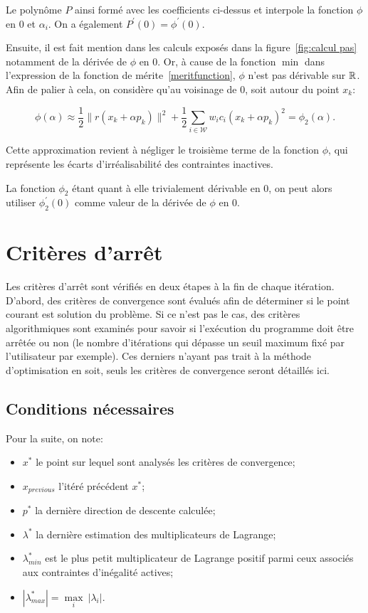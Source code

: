 Le polynôme $P$ ainsi formé avec les coefficients ci-dessus et interpole la fonction $\phi$ en $0$ et $\alpha_i$. On a également $P^\prime(0)=\phi^\prime(0)$.


Ensuite, il est fait mention dans les calculs exposés dans la figure~\ref{fig:calcul pas} notamment de la dérivée de $\phi$ en 0. Or, à cause de la fonction $\min$ dans
l'expression de la fonction de mérite~\eqref{meritfunction}, $\phi$ n'est pas dérivable sur $\mathbb{R}$. Afin de palier à cela, on considère qu'au voisinage de $0$,
soit autour du point $x_k$:

\[\phi(\alpha) \approx \dfrac{1}{2}\|r(x_k+\alpha p_k)\|^2 + \dfrac{1}{2}\sum_{i \in \mathcal{W}} w_ic_i(x_k+\alpha p_k)^2=\phi_2(\alpha).\]

Cette approximation revient à négliger le troisième terme de la fonction $\phi$, qui représente les écarts d'irréalisabilité des contraintes inactives.

La fonction $\phi_2$ étant quant à elle trivialement dérivable en 0,
on peut alors utiliser $\phi_2^\prime(0)$ comme valeur de la dérivée de $\phi$ en $0$.

\section{Critères d'arr\^et}\label{criteres_arret}


Les critères d'arrêt sont vérifiés en deux étapes à la fin de chaque itération. D'abord, des critères de convergence sont évalués afin de déterminer si le point courant 
est solution du problème. Si ce n'est pas le cas, des critères algorithmiques sont examinés pour savoir si l'exécution du programme doit être arrêtée ou non 
(le nombre d'itérations qui dépasse un seuil maximum fixé par l'utilisateur par exemple). Ces derniers n'ayant pas trait à la méthode d'optimisation en soit, seuls les critères 
de convergence seront détaillés ici.


\subsection*{Conditions nécessaires}

Pour la suite, on note: 
\begin{itemize}
    \item $x^*$ le point sur lequel sont analysés les critères de convergence;
    \item $x_{previous}$ l'itéré précédent $x^*$;
    \item $p^*$ la dernière direction de descente calculée;
    \item $\lambda^*$ la dernière estimation des multiplicateurs de Lagrange;
    \item $\lambda_{min}^*$ est le plus petit multiplicateur de Lagrange positif parmi ceux associés aux contraintes d'inégalité actives;
    \item $|\lambda_{max}^*|=\underset{i}{\max}\ |\lambda_i|$.
\end{itemize}

